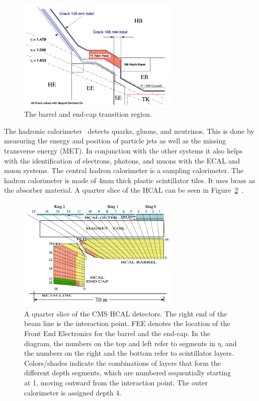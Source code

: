 \begin{figure}[htb]
\centering
\includegraphics[width=0.69\textwidth]{Experiment/ECAL_TDR_crack.pdf}
\caption{The barrel and end-cap transition region.~\cite{ECAL_report}}
\label{fig:CMS_ecal_crack}
\end{figure}

The hadronic calorimeter~\cite{HCAL_report} detects quarks, gluons, and neutrinos.  This is done by measuring the energy and position of particle jets as well as the missing transverse energy (MET).  In conjunction with the other systems it also helps with the identification of electrons, photons, and muons with the ECAL and muon systems.  The central hadron calorimeter is a sampling calorimeter. The hadron calorimeter is made of 4mm thick plastic scintillator tiles. It uses brass as the absorber material. A quarter slice of the HCAL can be seen in Figure~\ref{fig:CMS_hcal}~\cite{Chatrchyan:2009hw}.

\begin{figure}[htb]
\centering
\includegraphics[width=0.69\textwidth]{Experiment/fig_HCALdiagram.png}
\caption{A quarter slice of the CMS HCAL detectors. The right end of the beam line is the interaction point. FEE denotes the location of the Front End Electronics for the barrel and the end-cap. In the diagram, the numbers on the top and left refer to segments in $\eta$, and the numbers on the right and the bottom refer to scintillator layers. Colors/shades indicate the combinations of layers that form the different depth segments, which are numbered sequentially starting at 1, moving outward from the interaction point. The outer calorimeter is assigned depth 4.~\cite{Chatrchyan:2009hw}}
\label{fig:CMS_hcal}
\end{figure}


